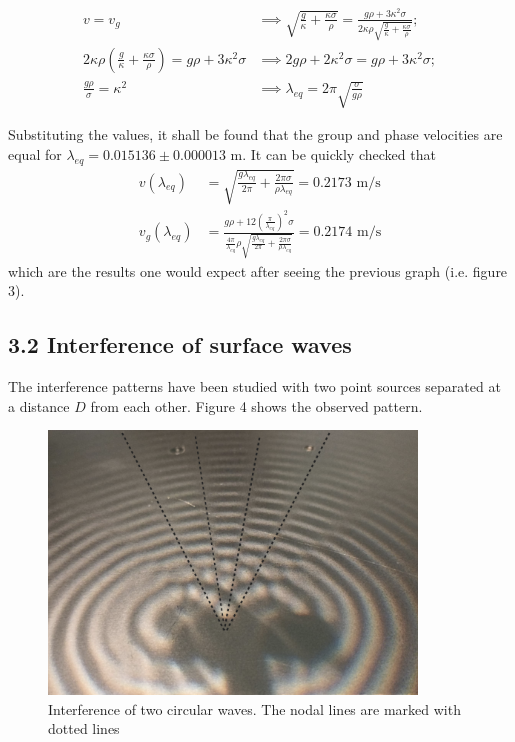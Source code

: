 \documentclass[a4paper, 12pt]{article}
\begin{document}
	\begin{align} 
		v = v_g &\implies \sqrt{\frac{g}{\kappa} + \frac{\kappa \sigma}{\rho}} = \frac{g\rho + 3\kappa^2\sigma}{2\kappa\rho \sqrt{\frac{g}{\kappa} + \frac{\kappa \sigma}{\rho}}}; \nonumber\\
		2\kappa \rho \left(\frac{g}{\kappa} + \frac{\kappa \sigma}{\rho}\right) = g\rho + 3\kappa^2\sigma &\implies 2g\rho + 2\kappa^2\sigma = g\rho + 3\kappa^2 \sigma; \nonumber \\
		 \frac{g\rho}{\sigma} = \kappa^2 &\implies \lambda_{eq} = 2\pi \sqrt{\frac{\sigma}{g\rho}}
	\end{align}

	Substituting the values, it shall be found that the group and phase velocities are equal for $\lambda_{eq} = 0.015136 \pm 0.000013 $ m. It can be quickly checked that \begin{align*}\label{speedcheck}
		v (\lambda_{eq}) &= \sqrt{\frac{g\lambda_{eq}}{2\pi} + \frac{2\pi\sigma}{\rho\lambda_{eq}}} = 0.2173 \mbox{ m/s}\\ 
		v_g (\lambda_{eq}) &= \frac{g\rho + 12\left(\frac{\pi}{\lambda_{eq}}\right)^2\sigma}{\frac{4\pi}{\lambda_{eq}}\rho \sqrt{\frac{g\lambda_{eq}}{2\pi} + \frac{2\pi \sigma}{\rho\lambda_{eq}}}} = 0.2174 \mbox{ m/s}
	\end{align*} 
	which are the results one would expect after seeing the previous graph (i.e. figure 3).
	\subsection{3.2 Interference of surface waves}
	The interference patterns have been studied with two point sources separated at a distance $D$ from each other. Figure 4 shows the observed pattern.\\
	\begin{figure}[h!]
		\centering
		\includegraphics[height=7cm]{ipat}
		\caption{Interference of two circular waves. The nodal lines are marked with dotted lines}
	\end{figure}
\end{document}
